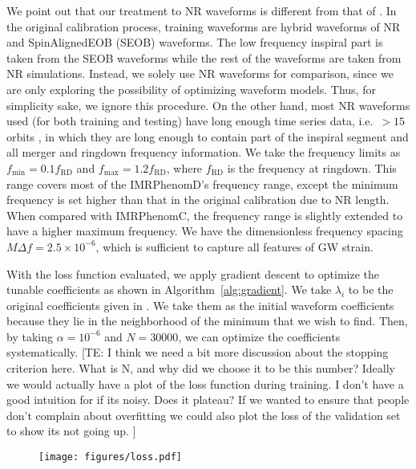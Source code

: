 \documentclass[twocolumn]{aastex631}
\newcommand{\te}[1]{{\color{rr}[TE: #1 ]}}
\begin{document}
We point out that our treatment to NR waveforms is different from that of \citep{husa2016frequency, khan2016frequency}. In the original calibration process, training waveforms are hybrid waveforms of NR and SpinAlignedEOB
(SEOB) waveforms. The low frequency inspiral part is taken from the SEOB
waveforms while the rest of the waveforms are taken from NR simulations.
Instead, we solely use NR waveforms for comparison, since we are only exploring the possibility of optimizing waveform models. Thus, for simplicity sake, we ignore this procedure. On the other hand, most NR waveforms used (for both training and testing) have long enough time series data, i.e.~$>15$ orbits \citep{boyle2019sxs}, in
which they are long enough to contain part of the inspiral segment and all
merger and ringdown frequency information. We take the frequency limits as
$f_{\mathrm{min}}=0.1f_{\mathrm{RD}}$ and $f_{\mathrm{max}}=1.2f_{\mathrm{RD}}$,	%
where $f_{\mathrm{RD}}$ is the frequency at ringdown. This range covers most of
the IMRPhenomD's frequency range, except the minimum frequency is set higher
than that in the original calibration due to NR length. When compared with
IMRPhenomC, the frequency range is slightly extended to have a higher maximum
frequency. We have the dimensionless frequency spacing $M\Delta f=2.5\times10^{-6}$, 
which is sufficient to capture all features of GW strain. 

With the loss function evaluated, we apply gradient descent to optimize the tunable
coefficients as shown in Algorithm~\ref{alg:gradient}. We take $\lambda_i$ to be the 
original coefficients given in \citep{khan2016frequency}. We take them as the initial 
waveform coefficients because they lie in the neighborhood of the minimum that we wish 
to find. Then, by taking $\alpha=10^{-6}$ and $N=30000$, we can optimize the 
coefficients systematically. 
\te{I think we need a bit more discussion about the stopping criterion here. What is N, and why did we choose it to be this number? Ideally we would actually have a plot of the loss function during training. I don't have a good intuition for if its noisy. Does it plateau? If we wanted to ensure that people don't complain about overfitting we could also plot the loss of the validation set to show its not going up.}

\begin{figure}
	\centering
	\texttt{[image: figures/loss.pdf]}
	\label{fig:loss}
\end{figure}
\end{document}
